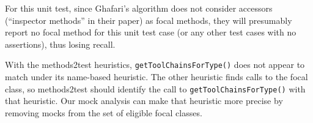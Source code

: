 For this unit test, since Ghafari's algorithm does not consider accessors (``inspector methods'' in their paper) as focal methods, they will presumably report no focal method for this unit test case (or any other test cases with no assertions), thus losing recall.


With the methods2test heuristics, \texttt{getToolChainsForType()} does not appear to match under its name-based heuristic. The other heuristic finds calls to the focal class, so methods2test should identify the call to \texttt{getToolChainsForType()} with that heuristic. Our mock analysis can make that heuristic more precise by removing mocks from the set of eligible focal classes.

		


